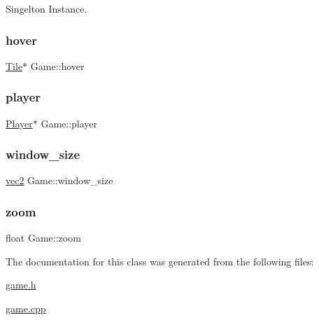 Singelton Instance. \mbox{\label{classGame_aa71eaba68ed3622567950659638b997e}} 
\subsubsection{\texorpdfstring{hover}{hover}}
{\footnotesize\ttfamily \hyperlink{classTile}{Tile}$\ast$ Game\+::hover\hspace{0.3cm}{\ttfamily [private]}}

\mbox{\label{classGame_abec70aa1c0269a9a7e171af4d79e08bf}} 
\subsubsection{\texorpdfstring{player}{player}}
{\footnotesize\ttfamily \hyperlink{classPlayer}{Player}$\ast$ Game\+::player\hspace{0.3cm}{\ttfamily [private]}}

\mbox{\label{classGame_abdc173d73c899329b1f3ed21b59508ee}} 
\subsubsection{\texorpdfstring{window\+\_\+size}{window\_size}}
{\footnotesize\ttfamily \hyperlink{structvec2}{vec2} Game\+::window\+\_\+size\hspace{0.3cm}{\ttfamily [private]}}

\mbox{\label{classGame_acf74ecf2e7981d8abe668305a77af96a}} 
\subsubsection{\texorpdfstring{zoom}{zoom}}
{\footnotesize\ttfamily float Game\+::zoom\hspace{0.3cm}{\ttfamily [private]}}



The documentation for this class was generated from the following files\+:\begin{DoxyCompactItemize}
\item 
\hyperlink{game_8h}{game.\+h}\item 
\hyperlink{game_8cpp}{game.\+cpp}\end{DoxyCompactItemize}
